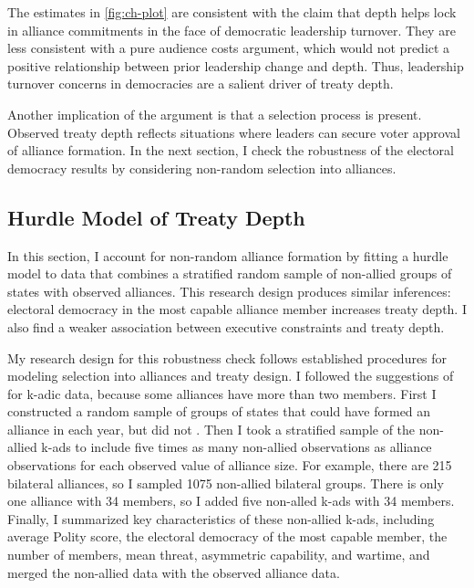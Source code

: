 \documentclass[12pt]{article}
\begin{document}
The estimates in \autoref{fig:ch-plot} are consistent with the claim that depth helps lock in alliance commitments in the face of democratic leadership turnover.
They are less consistent with a pure audience costs argument, which would not predict a positive relationship between prior leadership change and depth.   
Thus, leadership turnover concerns in democracies are a salient driver of treaty depth. 
 

Another implication of the argument is that a selection process is present. 
Observed treaty depth reflects situations where leaders can secure voter approval of alliance formation.
In the next section, I check the robustness of the electoral democracy results by considering non-random selection into alliances. 


\subsection{Hurdle Model of Treaty Depth} 


In this section, I account for non-random alliance formation by fitting a hurdle model to data that combines a stratified random sample of non-allied groups of states with observed alliances. 
This research design produces similar inferences: electoral democracy in the most capable alliance member increases treaty depth. 
I also find a weaker association between executive constraints and treaty depth. 


My research design for this robustness check follows established procedures for modeling selection into alliances and treaty design. 
I followed the suggestions of \citet{Poast2010} for k-adic data, because some alliances have more than two members. 
First I constructed a random sample of groups of states that could have formed an alliance in each year, but did not \citep{FordhamPoast2014}.
Then I took a stratified sample of the non-allied k-ads to include five times as many non-allied observations as alliance observations for each observed value of alliance size. 
For example, there are 215 bilateral alliances, so I sampled 1075 non-allied bilateral groups. 
There is only one alliance with 34 members, so I added five non-alled k-ads with 34 members. 
Finally, I summarized key characteristics of these non-allied k-ads, including average Polity score, the electoral democracy of the most capable member, the number of members, mean threat, asymmetric capability, and wartime, and merged the non-allied data with the observed alliance data. 
\end{document}
